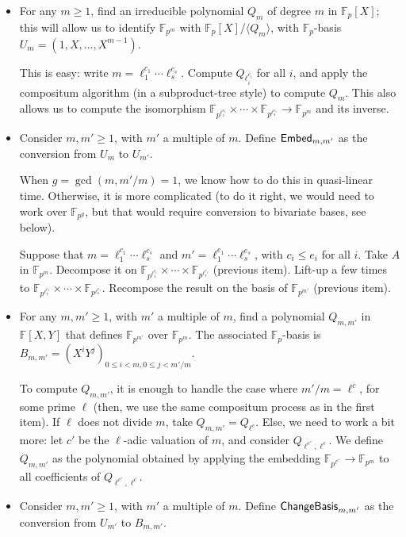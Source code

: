 \documentclass{sig-alternate}
\def\F {\ensuremath{\mathbb{F}}}
\begin{document}
\begin{itemize}
\item For any $m \ge 1$, find an irreducible polynomial $Q_m$ of
  degree $m$ in $\F_p[X]$; this will allow us to identify $\F_{p^m}$
  with $\F_p[X]/\langle Q_m \rangle$, with $\F_p$-basis
  $U_m=(1,X,\dots,X^{m-1})$. 

  This is easy: write $m = \ell_1^{c_1} \cdots \ell_s^{c_s}$. Compute
  $Q_{\ell_i^{c_i}}$ for all $i$, and apply the compositum algorithm
  (in a subproduct-tree style) to compute $Q_m$. This also allows us
  to compute the isomorphism $\F_{p^{\ell_1^{c_1}}} \times \cdots
  \times \F_{p^{\ell_s^{c_s}}} \to \F_{p^m}$ and its inverse.

\item Consider $m,m' \ge 1$, with $m'$ a multiple of $m$. Define ${\sf
  Embed}_{m,m'}$ as the conversion from $U_{m}$ to $U_{m'}$. 

  When $g=\gcd(m,m'/m)=1$, we know how to do this in quasi-linear
  time. Otherwise, it is more complicated (to do it right, we would
  need to work over $\F_{p^g}$, but that would require conversion to
  bivariate bases, see below).

  Suppose that $m = \ell_1^{c_1} \cdots \ell_s^{c_s}$ and $m' =
  \ell_1^{e_1} \cdots \ell_s^{e_s}$, with $c_i \le e_i$ for all $i$.
  Take $A$ in $\F_{p^m}$. Decompose it on $\F_{p^{\ell_1^{c_1}}}
  \times \cdots \times \F_{p^{\ell_s^{c_s}}}$ (previous item). Lift-up
  a few times to $\F_{p^{\ell_1^{e_1}}} \times \cdots \times
  \F_{p^{\ell_s^{e_s}}}$. Recompose the result on the basis of
  $\F_{p^{m'}}$ (previous item).

\item For any $m,m' \ge 1$, with $m'$ a multiple of $m$, find a
  polynomial $Q_{m,m'}$ in $\F[X,Y]$ that defines $\F_{p^{m'}}$ over
  $\F_{p^m}$. The associated $\F_p$-basis is $B_{m,m'}=(X^i Y^j)_{0
    \le i < m, 0 \le j < m'/m}$.

  To compute $Q_{m,m'}$, it is enough to handle the case where $m'/m =
  \ell^c$, for some prime $\ell$ (then, we use the same compositum
  process as in the first item). If $\ell$ does not divide $m$, take
  $Q_{m,m'}=Q_{\ell^c}$. Else, we need to work a bit more: let $c'$ be
  the $\ell$-adic valuation of $m$, and consider
  $Q_{\ell^{c'},\ell^c}$. We define $Q_{m,m'}$ as the polynomial
  obtained by applying the embedding $\F_{p^{\ell^{c'}}}\to\F_{p^m}$ to
  all coefficients of $Q_{\ell^{c'},\ell^c}$.
  
\item Consider $m,m' \ge 1$, with $m'$ a multiple of $m$. Define ${\sf
  ChangeBasis}_{m,m'}$ as the conversion from $U_{m'}$ to $B_{m,m'}$.
  

\end{itemize}
\end{document}

